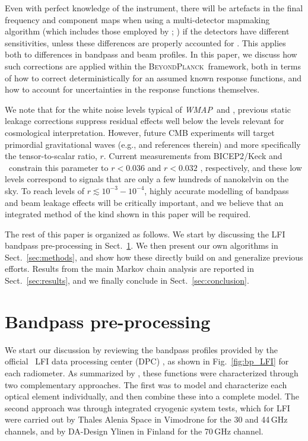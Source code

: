 \documentclass[twocolumn]{aa}
\def\WMAP{\textit{WMAP}}
\newcommand{\BP}{\textsc{BeyondPlanck}}
\newcommand{\?}[1]{\textcolor{red}{{\bf [#1]}}}
\begin{document}
Even with perfect knowledge of the instrument, there will be artefacts
in the final frequency and component maps when using a multi-detector
mapmaking algorithm (which includes those employed by \Planck;
\citealp{planck2016-l02,planck2016-l03}) if the detectors have
different sensitivities, unless these differences are properly
accounted for \citep[e.g.,][]{page2007,npipe,delouis:2019}. This
applies both to differences in bandpass and beam profiles. In this
paper, we discuss how such corrections are applied within the
\BP\ framework, both in terms of how to correct deterministically for
an assumed known response functions, and how to account for
uncertainties in the response functions themselves.

We note that for the white noise levels typical of \WMAP\ and \Planck, 
previous static leakage corrections suppress residual effects well below the
levels relevant for cosmological interpretation. However, future CMB experiments
will target primordial gravitational waves (e.g., \citep{kamionkowski:2016} and
references therein) and more specifically the tensor-to-scalar ratio, $r$.
Current measurements from BICEP2/Keck and \Planck\ constrain this parameter to
$r<0.036$ \citep{bicep2021} and $r<0.032$ \citep{tristram:2021}, respectively,
and these low levels correspond to signals that are only a few hundreds
of nanokelvin on the sky. To reach levels of $r\lesssim10^{-3}-10^{-4}$, highly
accurate modelling of bandpass and beam leakage effects will be critically
important, and we believe that an integrated method of the kind shown in this paper will be required.

The rest of this paper is organized as follows. We start by discussing
the LFI bandpass pre-processing in Sect.~\ref{sec:newprofs}. We then
present our own algorithms in Sect.~\ref{sec:methods}, and show how
these directly build on and generalize previous efforts. Results from
the main Markov chain analysis are reported in
Sect.~\ref{sec:results}, and we finally conclude in
Sect.~\ref{sec:conclusion}.

\section{Bandpass pre-processing}
\label{sec:newprofs}

We start our discussion by reviewing the bandpass profiles provided by the
official \Planck\ LFI data processing center (DPC) \citep{planck2013-p02}, as
shown in Fig.~\ref{fig:bp_LFI} for each radiometer. As summarized by
\citet{zonca2009}, these functions were characterized through two complementary
approaches. The first was to model and characterize each optical element
individually, and then combine these into a complete model. The second approach
was through integrated cryogenic system tests, which for LFI were carried out by
Thales Alenia Space in Vimodrone for the 30 and 44\,GHz channels, and by
DA-Design Ylinen in Finland for the 70\,GHz channel.
\end{document}
